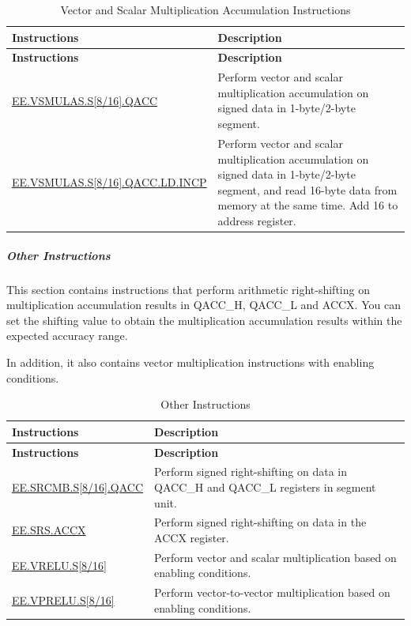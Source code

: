 \documentclass[main\_\_EN.tex]{subfiles}
\begin{document}
\begin{longtable}[c]{|l|m{10cm}|}
    \caption{Vector and Scalar Multiplication Accumulation Instructions}
    \label{tab:pie-vector-scalar-instructions}\\
    \hline
    \rowcolor{lightgray}
    \textbf{Instructions} & \textbf{Description} \\\hline
    \endfirsthead
    \rowcolor{lightgray}
    \textbf{Instructions} & \textbf{Description} \\\hline
    \endhead
    \endfoot

    \hyperref[instruction:EEVSMULASS8QACC]{EE.VSMULAS.S[8/16].QACC} & Perform vector and scalar multiplication accumulation on signed data in 1-byte/2-byte segment.
    \\\hline
    \hyperref[instruction:EEVSMULASS8QACCLDINCP]{EE.VSMULAS.S[8/16].QACC.LD.INCP} & Perform vector and scalar multiplication accumulation on signed data in 1-byte/2-byte segment, and read 16-byte data from memory at the same time. Add 16 to address register.
    \\\hline
\end{longtable}

\subparagraph{Other Instructions}

This section contains instructions that perform arithmetic right-shifting on multiplication accumulation results in QACC\_H, QACC\_L and ACCX. You can set the shifting value to obtain the multiplication accumulation results within the expected accuracy range.

In addition, it also contains vector multiplication instructions with enabling conditions.

\begin{longtable}[c]{|l|m{11cm}|}
    \caption{Other Instructions}
    \label{tab:pie-others-instructions}\\
    \hline
    \rowcolor{lightgray}
    \textbf{Instructions} & \textbf{Description} \\\hline
    \endfirsthead
    \rowcolor{lightgray}
    \textbf{Instructions} & \textbf{Description} \\\hline
    \endhead
    \endfoot

    \hyperref[instruction:EESRCMBS8QACC]{EE.SRCMB.S[8/16].QACC} & Perform signed right-shifting on data in QACC\_H and QACC\_L registers in segment unit.
    \\\hline
    \hyperref[instruction:EESRSACCX]{EE.SRS.ACCX} & Perform signed right-shifting on data in the ACCX register.
    \\\hline
    \hyperref[instruction:EEVRELUS8]{EE.VRELU.S[8/16]} & Perform vector and scalar multiplication based on enabling conditions.
    \\\hline
    \hyperref[instruction:EEVPRELUS8]{EE.VPRELU.S[8/16]} & Perform vector-to-vector multiplication based on enabling conditions.
    \\\hline
\end{longtable}
\end{document}
